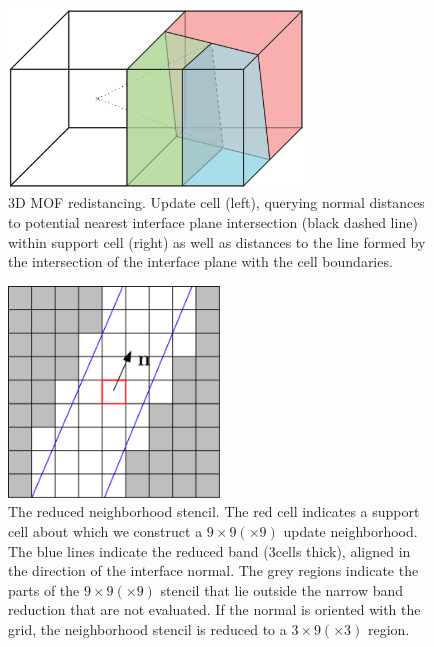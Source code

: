 \documentclass[preprint,12pt]{Definitions/elsarticle}
\begin{document}
\unskip
\begin{figure}[H]
	\centering
	\includegraphics[width=0.7\textwidth]{redistancing_3Dfixed.png}
	\caption{3D MOF redistancing. Update cell (left), querying normal distances to potential nearest interface plane intersection (black dashed line) within support cell (right) as well as distances to the line formed by the intersection of the interface plane with the cell boundaries.}
	\label{fig:redistancing_3D}
\end{figure}   
\unskip
\begin{figure}[H]
	\centering
	\includegraphics[width=0.5\textwidth]{reduced_stencil.eps}
	\caption{The reduced neighborhood stencil. The red cell indicates a support cell about which we construct a $9\times9(\times9)$ update neighborhood. The blue lines indicate the reduced band (3cells thick), aligned in the direction of the interface normal. The grey regions indicate the parts of the $9\times9(\times9)$ stencil that lie outside the narrow band reduction that are not evaluated. If the normal is oriented with the grid, the neighborhood stencil is reduced to a $3\times9(\times3)$ region.}
	\label{fig:reducedstencil}
\end{figure}   
\unskip
\end{document}
